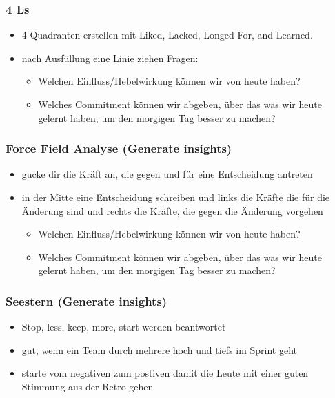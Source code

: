 \subsubsection{4 Ls}

\begin{itemize}
  \item 4 Quadranten erstellen mit Liked, Lacked, Longed For, and Learned.
  \item nach Ausfüllung eine Linie ziehen Fragen:
    \begin{itemize}
      \item Welchen Einfluss/Hebelwirkung können wir von heute haben?
      \item Welches Commitment können wir abgeben, über das was wir heute gelernt haben, um den
        morgigen Tag besser zu machen?
    \end{itemize}
\end{itemize}


\subsubsection{Force Field Analyse (Generate insights)}

\begin{itemize}
  \item gucke dir die Kräft an, die gegen und für eine Entscheidung antreten
  \item in der Mitte eine Entscheidung schreiben und links die Kräfte die für die Änderung sind und
    rechts die Kräfte, die gegen die Änderung vorgehen
    \begin{itemize}
      \item Welchen Einfluss/Hebelwirkung können wir von heute haben?
      \item Welches Commitment können wir abgeben, über das was wir heute gelernt haben, um den
        morgigen Tag besser zu machen?
    \end{itemize}
\end{itemize}


\subsubsection{Seestern (Generate insights)}

\begin{itemize}
  \item Stop, less, keep, more, start werden beantwortet
  \item gut, wenn ein Team durch mehrere hoch und tiefs im Sprint geht
  \item starte vom negativen zum postiven damit die Leute mit einer guten Stimmung aus der Retro
    gehen
\end{itemize}


